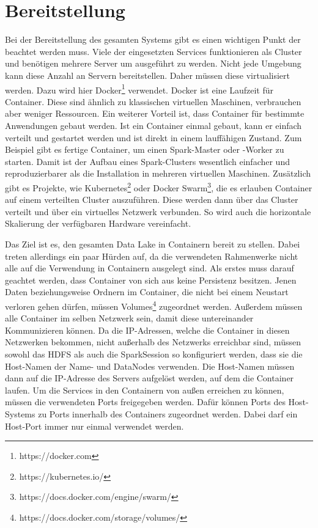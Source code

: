 \section{Bereitstellung}

Bei der Bereitstellung des gesamten Systems gibt es einen wichtigen Punkt der beachtet werden muss.
Viele der eingesetzten Services funktionieren als Cluster und benötigen mehrere Server um ausgeführt zu werden.
Nicht jede Umgebung kann diese Anzahl an Servern bereitstellen.
Daher müssen diese virtualisiert werden.
Dazu wird hier Docker\footnote{https://docker.com} verwendet.
Docker ist eine Laufzeit für Container.
Diese sind ähnlich zu klassischen virtuellen Maschinen, verbrauchen aber weniger Ressourcen.
Ein weiterer Vorteil ist, dass Container für bestimmte Anwendungen gebaut werden.
Ist ein Container einmal gebaut, kann er einfach verteilt und gestartet werden und ist direkt in einem lauffähigen Zustand.
Zum Beispiel gibt es fertige Container, um einen Spark-Master oder -Worker zu starten.
Damit ist der Aufbau eines Spark-Clusters wesentlich einfacher und reproduzierbarer als die Installation in mehreren virtuellen Maschinen.
Zusätzlich gibt es Projekte, wie Kubernetes\footnote{https://kubernetes.io/} oder Docker Swarm\footnote{https://docs.docker.com/engine/swarm/}, die es erlauben Container auf einem verteilten Cluster auszuführen.
Diese werden dann über das Cluster verteilt und über ein virtuelles Netzwerk verbunden.
So wird auch die horizontale Skalierung der verfügbaren Hardware vereinfacht.

Das Ziel ist es, den gesamten Data Lake in Containern bereit zu stellen.
Dabei treten allerdings ein paar Hürden auf, da die verwendeten Rahmenwerke nicht alle auf die Verwendung in Containern ausgelegt sind.
Als erstes muss darauf geachtet werden, dass Container von sich aus keine Persistenz besitzen.
Jenen Daten beziehungsweise Ordnern im Container, die nicht bei einem Neustart verloren gehen dürfen, müssen Volumes\footnote{https://docs.docker.com/storage/volumes/} zugeordnet werden.
Außerdem müssen alle Container im selben Netzwerk sein, damit diese untereinander Kommunizieren können.
Da die IP-Adressen, welche die Container in diesen Netzwerken bekommen, nicht außerhalb des Netzwerks erreichbar sind, müssen sowohl das HDFS als auch die SparkSession so konfiguriert werden, dass sie die Host-Namen der Name- und DataNodes verwenden.
Die Host-Namen müssen dann auf die IP-Adresse des Servers aufgelöst werden, auf dem die Container laufen.
Um die Services in den Containern von außen erreichen zu können, müssen die verwendeten Ports freigegeben werden.
Dafür können Ports des Host-Systems zu Ports innerhalb des Containers zugeordnet werden.
Dabei darf ein Host-Port immer nur einmal verwendet werden.

